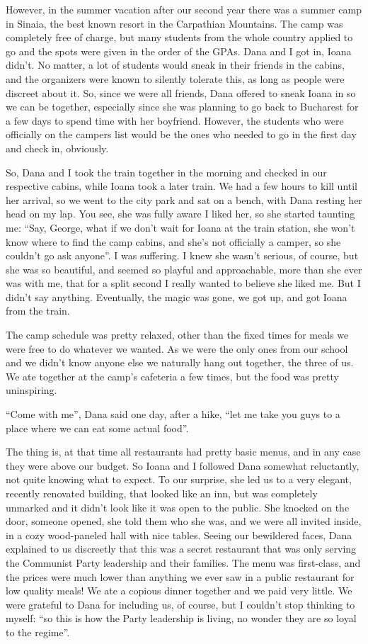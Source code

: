 \documentclass[12pt]{book}
\begin{document}
However, in the summer vacation after our second year there was a summer
camp in Sinaia, the best known resort in the Carpathian Mountains. The
camp was completely free of charge, but many students from the whole
country applied to go and the spots were given in the order of the GPAs.
Dana and I got in, Ioana didn't. No matter, a lot of students would
sneak in their friends in the cabins, and the organizers were known to
silently tolerate this, as long as people were discreet about it. So,
since we were all friends, Dana offered to sneak Ioana in so we can be
together, especially since she was planning to go back to Bucharest for
a few days to spend time with her boyfriend. However, the students who
were officially on the campers list would be the ones who needed to go
in the first day and check in, obviously.

So, Dana and I took the train together in the morning and checked in our
respective cabins, while Ioana took a later train. We had a few hours to
kill until her arrival, so we went to the city park and sat on a bench,
with Dana resting her head on my lap. You see, she was fully aware I
liked her, so she started taunting me: ``Say, George, what if we don't
wait for Ioana at the train station, she won't know where to find the
camp cabins, and she's not officially a camper, so she couldn't go ask
anyone''. I was suffering. I knew she wasn't serious, of course, but she
was so beautiful, and seemed so playful and approachable, more than she
ever was with me, that for a split second I really wanted to believe she
liked me. But I didn't say anything. Eventually, the magic was gone, we
got up, and got Ioana from the train.

The camp schedule was pretty relaxed, other than the fixed times for
meals we were free to do whatever we wanted. As we were the only ones
from our school and we didn't know anyone else we naturally hang out
together, the three of us. We ate together at the camp's cafeteria a few
times, but the food was pretty uninspiring.

``Come with me'', Dana said one day, after a hike, ``let me take you
guys to a place where we can eat some actual food''.

The thing is, at that time all restaurants had pretty basic menus, and
in any case they were above our budget. So Ioana and I followed Dana
somewhat reluctantly, not quite knowing what to expect. To our surprise,
she led us to a very elegant, recently renovated building, that looked
like an inn, but was completely unmarked and it didn't look like it was
open to the public. She knocked on the door, someone opened, she told
them who she was, and we were all invited inside, in a cozy wood-paneled
hall with nice tables. Seeing our bewildered faces, Dana explained to us
discreetly that this was a secret restaurant that was only serving the
Communist Party leadership and their families. The menu was first-class,
and the prices were much lower than anything we ever saw in a public
restaurant for low quality meals! We ate a copious dinner together and
we paid very little. We were grateful to Dana for including us, of
course, but I couldn't stop thinking to myself: ``so this is how the
Party leadership is living, no wonder they are so loyal to the regime''.
\end{document}
